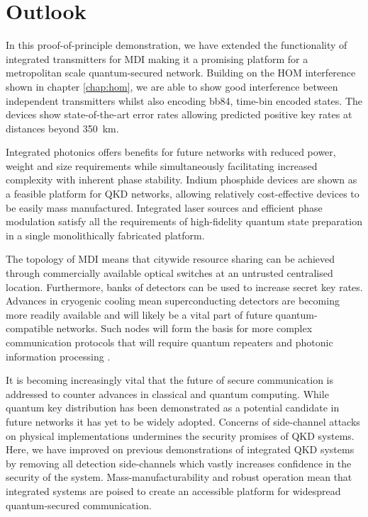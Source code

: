 \section{Outlook}

In this proof-of-principle demonstration, we have extended the functionality of integrated transmitters for \acl{MDI} making it a promising platform for a metropolitan scale quantum-secured network. Building on the \acl{HOM} interference shown in chapter \ref{chap:hom}, we are able to show good interference between independent transmitters whilst also encoding \ac{bb84}, time-bin encoded states. The devices show state-of-the-art error rates allowing predicted positive key rates at distances beyond \SI{350}{\km}.

Integrated photonics offers benefits for future networks with reduced power, weight and size requirements while simultaneously facilitating increased complexity with inherent phase stability. Indium phosphide devices are shown as a feasible platform for \ac{QKD} networks, allowing relatively cost-effective devices to be easily mass manufactured. Integrated laser sources and efficient phase modulation satisfy all the requirements of high-fidelity quantum state preparation in a single monolithically fabricated platform. 

The topology of \ac{MDI} means that citywide resource sharing can be achieved through commercially available optical switches at an untrusted centralised location. Furthermore, banks of detectors can be used to increase secret key rates. Advances in cryogenic cooling mean superconducting detectors are becoming more readily available and will likely be a vital part of future quantum-compatible networks. Such nodes will form the basis for more complex communication protocols that will require quantum repeaters and photonic information processing \cite{wehner2018}. 

It is becoming increasingly vital that the future of secure communication is addressed to counter advances in classical and quantum computing. While quantum key distribution has been demonstrated as a potential candidate in future networks it has yet to be widely adopted. Concerns of side-channel attacks on physical implementations undermines the security promises of \ac{QKD} systems. Here, we have improved on previous demonstrations of integrated \ac{QKD} systems by removing all detection side-channels which vastly increases confidence in the security of the system. Mass-manufacturability and robust operation mean that integrated systems are poised to create an accessible platform for widespread quantum-secured communication.

